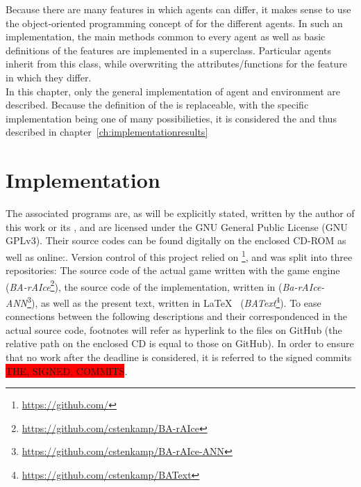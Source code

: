 Because there are many features in which agents can differ, it makes sense to use the object-oriented programming concept of  for the different agents. In such an implementation, the main methods common to every agent as well as basic definitions of the features are implemented in a superclass. Particular agents inherit from this class, while overwriting the attributes/functions for the feature in which they differ.\\

In this chapter, only the general implementation of agent and environment are described. Because the definition of the  is replaceable, with the specific implementation being one of many possibilieties, it is considered the  and thus described in chapter~\ref{ch:implementationresults}

\section{Implementation}

\label{ch:implementation}

The associated programs are, as will be explicitly stated, written by the author of this work or its \leonbase, and are licensed under the GNU General Public License (GNU GPLv3). Their source codes can be found digitally on the enclosed CD-ROM as well as online:. Version control of this project relied on \footnote{\url{https://github.com/}}, and was split into three repositories: The source code of the actual game written with the game engine  (\textit{BA-rAIce}\footnote{\url{https://github.com/cstenkamp/BA-rAIce}}), the source code of the implementation, written in  (\textit{Ba-rAIce-ANN}\footnote{\url{https://github.com/cstenkamp/BA-rAIce-ANN}}), as well as the present text, written in \LaTeX ~ (\textit{BAText}\footnote{\url{https://github.com/cstenkamp/BAText}}). To ease connections between the following descriptions and their correspondenced in the actual source code, footnotes will refer as hyperlink to the files on GitHub (the relative path on the enclosed CD is equal to those on GitHub). In order to ensure that no work after the deadline is considered, it is referred to the signed commits \colorbox{red}{THE, SIGNED, COMMITS}.

